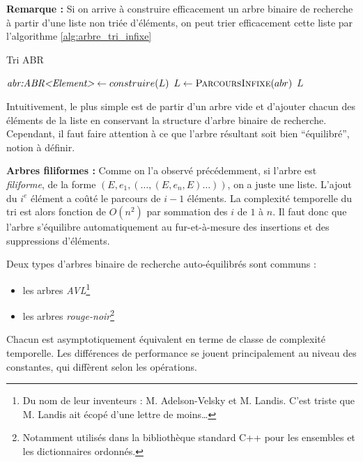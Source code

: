 \documentclass[../../../main.tex]{subfiles}
\begin{document}
\textbf{Remarque :} Si on arrive à construire efficacement un arbre binaire de recherche à partir d'une liste non triée d'éléments, on peut trier efficacement cette liste par l'algorithme \ref{alg:arbre_tri_infixe}

\begin{algorithm}
\caption{Tri ABR\label{alg:arbre_tri_infixe}}
$\textit{abr:ABR\textless{}Element\textgreater} \leftarrow construire(L)$\;
$L\leftarrow \textsc{ParcoursInfixe}(abr)$\;
\Return $L$\;
\end{algorithm}

Intuitivement, le plus simple est de partir d'un arbre vide et d'ajouter chacun des éléments de la liste en conservant la structure d'arbre binaire de recherche. Cependant, il faut faire attention à ce que l'arbre résultant soit bien ``équilibré'', notion à définir. 

\textbf{Arbres filiformes :} Comme on l'a observé précédemment, si l'arbre est \textit{filiforme}, de la forme $(E, e_1, (\dots, (E, e_n, E)\dots))$, on a juste une liste. L'ajout du $i^e$ élément a coûté le parcours de $i-1$ éléments. La complexité temporelle du tri est alors fonction de $O(n^2)$ par sommation des $i$ de $1$ à $n$. Il faut donc que l'arbre s'équilibre automatiquement au fur-et-à-mesure des insertions et des suppressions d'éléments.

Deux types d'arbres binaire de recherche auto-équilibrés sont communs :
\begin{itemize}
	\item les arbres \textit{AVL}\footnote{Du nom de leur inventeurs : M. Adelson-Velsky et M. Landis. C'est triste que M. Landis ait écopé d'une lettre de moins\dots}
	\item les arbres \textit{rouge-noir}\footnote{Notamment utilisés dans la bibliothèque standard C++ pour les ensembles et les dictionnaires ordonnés.}
\end{itemize}
Chacun est asymptotiquement équivalent en terme de classe de complexité temporelle. Les différences de performance se jouent principalement au niveau des constantes, qui diffèrent selon les opérations.
\end{document}
